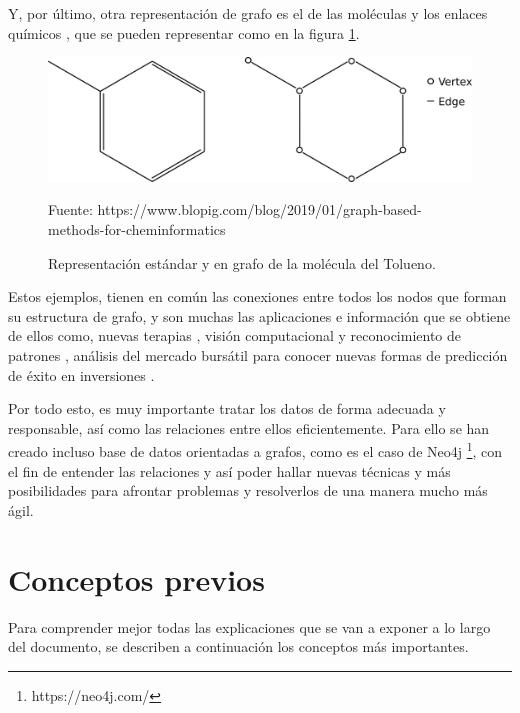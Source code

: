 Y, por último, otra representación de grafo es el de las moléculas y los enlaces químicos \cite{grafo-molecula}, que se pueden representar como en la figura \ref{fig:molecula-graph}.

 \begin{figure}[H]
	\centering
	\includegraphics[scale=0.3]{Figures/molecula-graph.pdf}
	\caption{Representación estándar y en grafo de la molécula del Tolueno.}
	\scriptsize Fuente: https://www.blopig.com/blog/2019/01/graph-based-methods-for-cheminformatics
	\label{fig:molecula-graph}
\end{figure}

Estos ejemplos, tienen en común las conexiones entre todos los nodos que forman su estructura de grafo, y son muchas las aplicaciones e información que se obtiene de ellos como, nuevas terapias \cite{top-molec}, visión computacional y reconocimiento de patrones \cite{mcp-compVision}, análisis del mercado bursátil para conocer nuevas formas de predicción de éxito en inversiones \cite{vid-graf-ai}.

Por todo esto, es muy importante tratar los datos de forma adecuada y responsable, así como las relaciones entre ellos eficientemente. Para ello se han creado incluso base de datos orientadas a grafos, como es el caso de Neo4j \footnote{https://neo4j.com/}, con el fin de entender las relaciones y así poder hallar nuevas técnicas y más posibilidades para afrontar problemas y resolverlos de una manera mucho más ágil.


\section{Conceptos previos}
Para comprender mejor todas las explicaciones que se van a exponer a lo largo del documento, se describen a continuación los conceptos más importantes.

